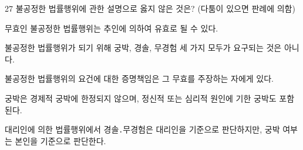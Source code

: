 \begin{question}{27}
불공정한 법률행위에 관한 설명으로 옳지 않은 것은? (다툼이 있으면 판례에 의함)
\begin{choices}
  \item 무효인 불공정한 법률행위는 추인에 의하여 유효로 될 수 있다.
  \item 불공정한 법률행위가 되기 위해 궁박, 경솔, 무경험 세 가지 모두가 요구되는 것은 아니다.
  \item 불공정한 법률행위의 요건에 대한 증명책임은 그 무효를 주장하는 자에게 있다.
  \item 궁박은 경제적 궁박에 한정되지 않으며, 정신적 또는 심리적 원인에 기한 궁박도 포함된다.
  \item 대리인에 의한 법률행위에서 경솔․무경험은 대리인을 기준으로 판단하지만, 궁박 여부는 본인을 기준으로 판단한다.
\end{choices}
\end{question}
